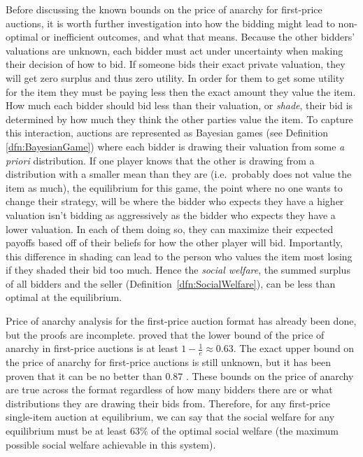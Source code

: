 \documentclass[12pt,twoside]{reedthesis}
\begin{document}
Before discussing the known bounds on the price of anarchy for first-price auctions, it is worth further investigation into how the bidding might lead to non-optimal or inefficient outcomes, and what that means. Because the other bidders' valuations are unknown, each bidder must act under uncertainty when making their decision of how to bid. If someone bids their exact private valuation, they will get zero surplus and thus zero utility. In order for them to get some utility for the item they must be paying less then the exact amount they value the item. How much each bidder should bid less than their valuation, or {\em shade}, their bid is determined by how much they think the other parties value the item. To capture this interaction, auctions are represented as Bayesian games (see Definition \ref{dfn:BayesianGame}) where each bidder is drawing their valuation from some {\em a priori} distribution. If one player knows that the other is drawing from a distribution with a smaller mean than they are (i.e.~probably does not value the item as much), the equilibrium for this game, the point where no one wants to change their strategy, will be where the bidder who expects they have a higher valuation isn't bidding as aggressively as the bidder who expects they have a lower valuation. In each of them doing so, they can maximize their expected payoffs based off of their beliefs for how the other player will bid. Importantly, this difference in shading can lead to the person who values the item most losing if they shaded their bid too much. Hence the {\em social welfare}, the summed surplus of all bidders and the seller (Definition~\ref{dfn:SocialWelfare}), can be less than optimal at the equilibrium. 

Price of anarchy analysis for the first-price auction format has already been done, but the proofs are incomplete. \cite{Syrgkanis2013} proved that the lower bound of the price of anarchy in first-price auctions is at least $1 - \frac{1}{e} \approx 0.63$. The exact upper bound on the price of anarchy for first-price auctions is still unknown, but it has been proven that it can be no better than $0.87$ \citep{Hartline2015}. These bounds on the price of anarchy are true across the format regardless of how many bidders there are or what distributions they are drawing their bids from. Therefore, for any first-price single-item auction at equilibrium, we can say that the social welfare for any equilibrium must be at least $63\%$ of the optimal social welfare (the maximum possible social welfare achievable in this system). 
\end{document}
